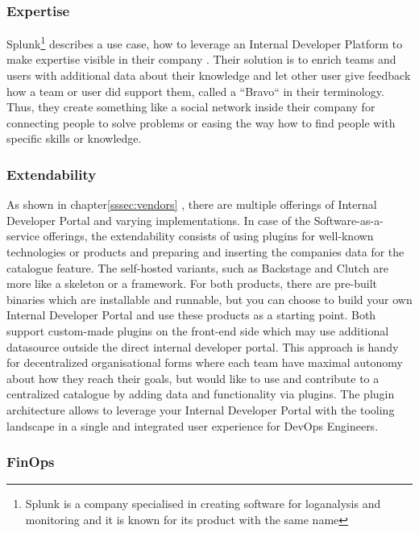\documentclass[a4paper,12pt]{article}
\begin{document}
    \subsubsection{Expertise}
    Splunk\footnote{Splunk is a company specialised in creating software for loganalysis and monitoring and it is known
    for its product with the same name}
    describes a use case, how to leverage an Internal Developer Platform to make expertise visible in their
    company\parencite{splunkidp} .
    Their solution is to enrich teams and users with additional data about their knowledge and let other user give feedback
    how a team or user did support them, called a ``Bravo`` in their terminology.
    Thus, they create something like a social network inside their company for connecting people to solve problems or
    easing the way how to find people with specific skills or knowledge.

    \subsubsection{Extendability}
    As shown in chapter\ref{sssec:vendors} , there are multiple offerings of Internal Developer Portal and varying
    implementations.
    In case of the Software-as-a-service offerings, the extendability consists of using plugins for well-known
    technologies or products and preparing and inserting the companies data for the catalogue feature.
    The self-hosted variants, such as Backstage and Clutch are more like a skeleton or a framework.
    For both products, there are pre-built binaries which are installable and runnable, but you can choose to build your
    own Internal Developer Portal and use these products as a starting point.
    Both support custom-made plugins on the front-end side which may use additional datasource outside the direct
    internal developer portal.
    This approach is handy for decentralized organisational forms where each team have maximal autonomy about how they
    reach their goals, but would like to use and contribute to a centralized catalogue by adding data and functionality
    via plugins.
    The plugin architecture allows to leverage your Internal Developer Portal with the tooling landscape in a
    single and integrated user experience for DevOps Engineers.

    \subsubsection{FinOps}
    \pagebreak
\end{document}
